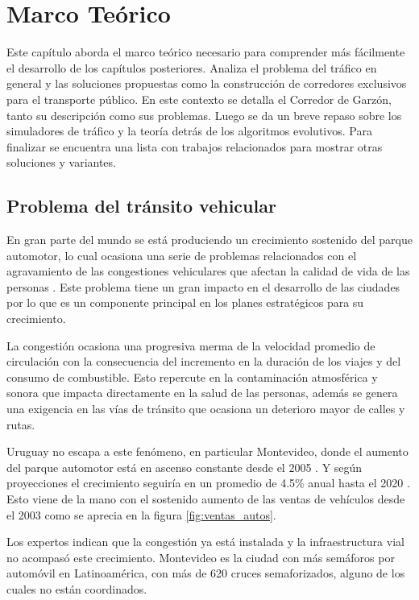 \chapter{Marco Teórico}
Este capítulo aborda el marco teórico necesario para comprender más fácilmente el desarrollo de los capítulos posteriores. Analiza el problema del tráfico en general y las soluciones propuestas como la construcción de corredores exclusivos para el transporte público. En este contexto se detalla el Corredor de Garzón, tanto su descripción como sus problemas. Luego se da un breve repaso sobre los simuladores de tráfico y la teoría detrás de los algoritmos evolutivos. Para finalizar se encuentra una lista con trabajos relacionados para mostrar otras soluciones y variantes.
\section{Problema del tránsito vehicular}

En gran parte del mundo se está produciendo un crecimiento sostenido del parque automotor, lo cual ocasiona una serie de problemas relacionados con el agravamiento de las congestiones vehiculares que afectan la calidad de vida de las personas \citep{Cepal2003}. Este problema tiene un gran impacto en el desarrollo de las ciudades por lo que es un componente principal en los planes estratégicos para su crecimiento.

La congestión ocasiona una progresiva merma de la velocidad promedio de circulación con la consecuencia del incremento en la duración de los viajes y del consumo de combustible. Esto repercute en la contaminación atmosférica y sonora que impacta directamente en la salud de las personas, además se genera una exigencia en las vías de tránsito que ocasiona un deterioro mayor de calles y rutas.

Uruguay no escapa a este fenómeno, en particular Montevideo, donde el aumento del parque automotor está en ascenso constante desde el 2005 \citep{INE2014}. Y según proyecciones el crecimiento seguiría en un promedio de 4.5\% anual hasta el 2020 \citep{BBVA2013}. Esto viene de la mano con el sostenido aumento de las ventas de vehículos desde el 2003 como se aprecia en la figura \ref{fig:ventas_autos}.

Los expertos indican que la congestión ya está instalada y la infraestructura vial no acompasó este crecimiento. Montevideo es la ciudad con más semáforos por automóvil en Latinoamérica, con más de 620 cruces semaforizados, alguno de los cuales no están coordinados.\citep{Subrayado2013}

